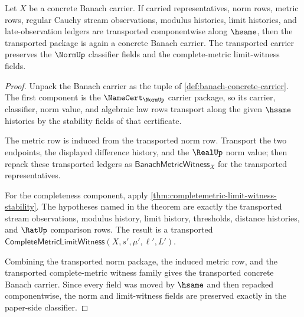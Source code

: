\begin{theorem}
\label{thm:banach-hsame-transport}
Let $X$ be a concrete Banach carrier. If carried representatives, norm rows,
metric rows, regular Cauchy stream observations, modulus histories, limit
histories, and late-observation ledgers are transported componentwise along
$\hsame$, then the transported package is again a concrete Banach carrier.
The transported carrier preserves the $\NormUp$ classifier fields and the
complete-metric limit-witness fields.
\end{theorem}
\begin{proof}
Unpack the Banach carrier as the tuple of \autoref{def:banach-concrete-carrier}.
The first component is the $\NameCert_{\NormUp}$ carrier package, so its
carrier, classifier, norm value, and algebraic law rows transport along the
given $\hsame$ histories by the stability fields of that certificate.

The metric row is induced from the transported norm row. Transport the two
endpoints, the displayed difference history, and the $\RealUp$ norm value;
then repack these transported ledgers as
$\mathsf{BanachMetricWitness}_X$ for the transported representatives.

For the completeness component, apply
\autoref{thm:completemetric-limit-witness-stability}. The hypotheses named in
the theorem are exactly the transported stream observations, modulus history,
limit history, thresholds, distance histories, and $\RatUp$ comparison rows.
The result is a transported
$\mathsf{CompleteMetricLimitWitness}(X,s',\mu',\ell',L')$.

Combining the transported norm package, the induced metric row, and the
transported complete-metric witness family gives the transported concrete
Banach carrier. Since every field was moved by $\hsame$ and then repacked
componentwise, the norm and limit-witness fields are preserved exactly in the
paper-side classifier.
\end{proof}

